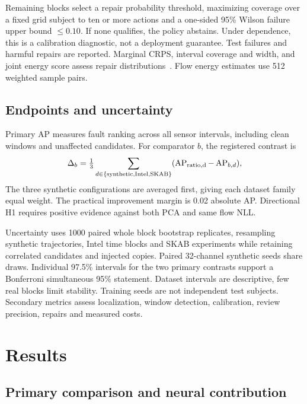 \documentclass{llncs}
\newcommand{\1}{\mathbf{1}}
\begin{document}
Remaining blocks select a repair probability threshold, maximizing coverage over a fixed grid subject to ten or more actions and a one-sided 95\% Wilson failure upper bound $\leq0.10$. If none qualifies, the policy abstains. Under dependence, this is a calibration diagnostic, not a deployment guarantee. Test failures and harmful repairs are reported. Marginal CRPS, interval coverage and width, and joint energy score assess repair distributions~\cite{crps}. Flow energy estimates use 512 weighted sample pairs.

\subsection{Endpoints and uncertainty}
Primary AP measures fault ranking across all sensor intervals, including clean windows and unaffected candidates. For comparator $b$, the registered contrast is
\[
 \Delta_b=\tfrac13\sum_{d\in\{\mathrm{synthetic,Intel,SKAB}\}}
       (\operatorname{AP}_{\rm ratio,d}-\operatorname{AP}_{b,d}),
\]
The three synthetic configurations are averaged first, giving each dataset family equal weight. The practical improvement margin is 0.02 absolute AP. Directional H1 requires positive evidence against both PCA and same flow NLL.

Uncertainty uses 1000 paired whole block bootstrap replicates, resampling synthetic trajectories, Intel time blocks and SKAB experiments while retaining correlated candidates and injected copies. Paired 32-channel synthetic seeds share draws. Individual 97.5\% intervals for the two primary contrasts support a Bonferroni simultaneous 95\% statement. Dataset intervals are descriptive, few real blocks limit stability. Training seeds are not independent test subjects. Secondary metrics assess localization, window detection, calibration, review precision, repairs and measured costs.






\section{Results}

\subsection{Primary comparison and neural contribution}
\end{document}
